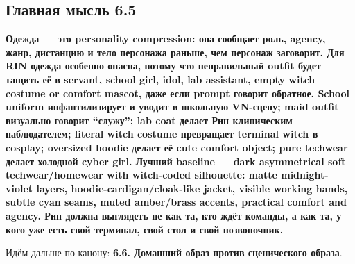 \subsection*{Главная мысль 6.5}

\textbf{Одежда --- это personality compression: она сообщает роль,
agency, жанр, дистанцию и тело персонажа раньше, чем персонаж заговорит.
Для RIN одежда особенно опасна, потому что неправильный outfit будет
тащить её в servant, school girl, idol, lab assistant, empty witch
costume or comfort mascot, даже если prompt говорит обратное. School
uniform инфантилизирует и уводит в школьную VN-сцену; maid outfit
визуально говорит ``служу''; lab coat делает Рин клиническим
наблюдателем; literal witch costume превращает terminal witch в cosplay;
oversized hoodie делает её cute comfort object; pure techwear делает
холодной cyber girl. Лучший baseline --- dark asymmetrical soft
techwear/\hspace{0pt}homewear with witch-coded silhouette: matte midnight-violet
layers, hoodie-cardigan/\hspace{0pt}cloak-like jacket, visible working hands, subtle
cyan seams, muted amber/\hspace{0pt}brass accents, practical comfort and agency. Рин
должна выглядеть не как та, кто ждёт команды, а как та, у кого уже есть
свой терминал, свой стол и свой позвоночник.}

Идём дальше по канону: \textbf{6.6. Домашний образ против сценического
образа}.

